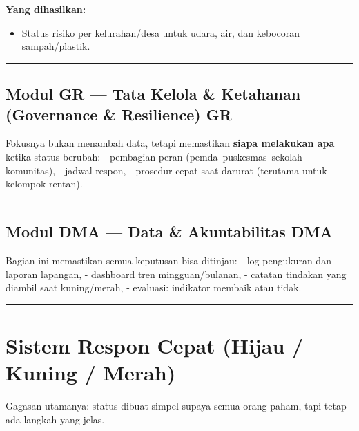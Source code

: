 \documentclass[
  letterpaper,
  DIV=11,
  numbers=noendperiod]{scrreprt}
\providecommand{\tightlist}{%
  \setlength{\itemsep}{0pt}\setlength{\parskip}{0pt}}
\begin{document}
\textbf{Yang dihasilkan:}

\begin{itemize}
\tightlist
\item
  Status risiko per kelurahan/desa untuk udara, air, dan kebocoran
  sampah/plastik.
\end{itemize}

\begin{center}\rule{0.5\linewidth}{0.5pt}\end{center}

\subsection{\texorpdfstring{Modul GR --- Tata Kelola \& Ketahanan
(Governance \& Resilience)
{GR}}{Modul GR --- Tata Kelola \& Ketahanan (Governance \& Resilience) GR}}\label{modul-gr-tata-kelola-ketahanan-governance-resilience-gr}

Fokusnya bukan menambah data, tetapi memastikan \textbf{siapa melakukan
apa} ketika status berubah: - pembagian peran
(pemda--puskesmas--sekolah--komunitas), - jadwal respon, - prosedur
cepat saat darurat (terutama untuk kelompok rentan).

\begin{center}\rule{0.5\linewidth}{0.5pt}\end{center}

\subsection{\texorpdfstring{Modul DMA --- Data \& Akuntabilitas
{DMA}}{Modul DMA --- Data \& Akuntabilitas DMA}}\label{modul-dma-data-akuntabilitas-dma}

Bagian ini memastikan semua keputusan bisa ditinjau: - log pengukuran
dan laporan lapangan, - dashboard tren mingguan/bulanan, - catatan
tindakan yang diambil saat kuning/merah, - evaluasi: indikator membaik
atau tidak.

\begin{center}\rule{0.5\linewidth}{0.5pt}\end{center}

\section{Sistem Respon Cepat (Hijau / Kuning /
Merah)}\label{sistem-respon-cepat-hijau-kuning-merah}

Gagasan utamanya: status dibuat simpel supaya semua orang paham, tapi
tetap ada langkah yang jelas.
\end{document}
